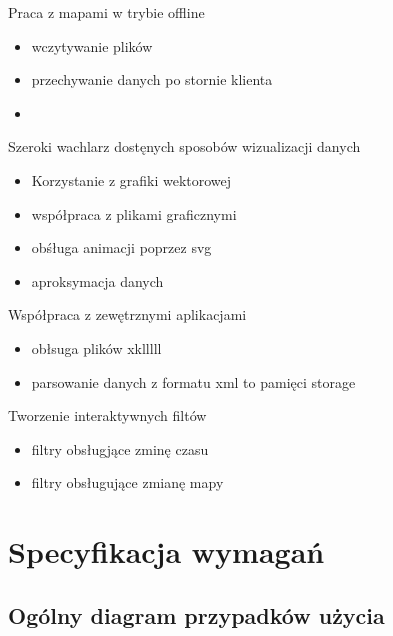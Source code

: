 Praca z mapami w trybie offline
\begin{itemize}
\item
wczytywanie plików

\item
przechywanie danych po stornie klienta

\item


\end{itemize}

Szeroki wachlarz dostęnych sposobów wizualizacji danych
\begin{itemize}
\item
Korzystanie z grafiki wektorowej

\item
współpraca z plikami graficznymi

\item
obśługa animacji poprzez svg

\item
aproksymacja danych

\end{itemize}

Współpraca z zewętrznymi aplikacjami
\begin{itemize}
\item
obłsuga plików xklllll

\item
parsowanie danych z formatu xml to pamięci storage
\end{itemize}

Tworzenie interaktywnych filtów
\begin{itemize}
\item
filtry obsługjące zminę czasu

\item
filtry obsługujące zmianę mapy

\end{itemize}

\section{Specyfikacja wymagań}
\label{sec:specyfikacja wymagan}

\subsection{Ogólny diagram przypadków użycia}

